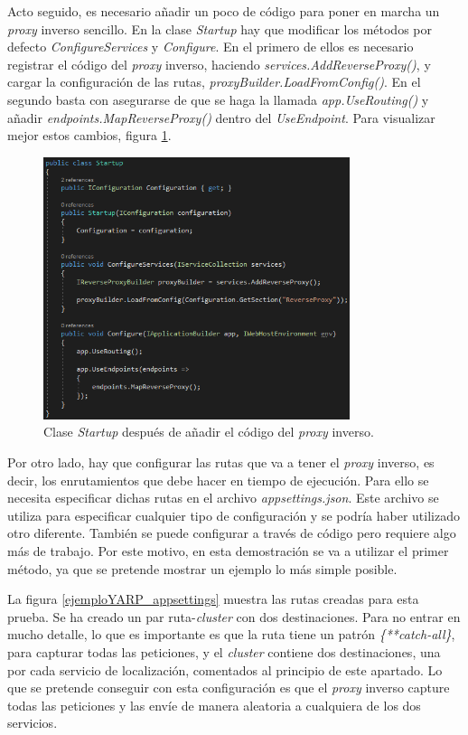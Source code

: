 \documentclass[11pt,spanish,listoffigures]{tfgetsinf}
\begin{document}
Acto seguido, es necesario añadir un poco de código para poner en marcha un \emph{proxy} inverso sencillo. En la clase \emph{Startup} hay que modificar los métodos por defecto \emph{ConfigureServices} y \emph{Configure}. En el primero de ellos es necesario registrar el código del \emph{proxy} inverso, haciendo \emph{services.AddReverseProxy()}, y cargar la configuración de las rutas, \emph{proxyBuilder.LoadFromConfig()}. En el segundo basta con asegurarse de que se haga la llamada \emph{app.UseRouting()} y añadir  \emph{endpoints.MapReverseProxy()} dentro del \emph{UseEndpoint}. Para visualizar mejor estos cambios, figura \ref{ejemploYARP_startup}.

\begin{figure}[ht]
\centering
\includegraphics[width=0.8\textwidth]{imagenes/ejemploYARP/startup}
\caption{Clase \emph{Startup} después de añadir el código del \emph{proxy} inverso.}
	\label{ejemploYARP_startup}
\end{figure}

Por otro lado, hay que configurar las rutas que va a tener el \emph{proxy} inverso, es decir, los enrutamientos que debe hacer en tiempo de ejecución. Para ello se necesita especificar dichas rutas en el archivo \emph{appsettings.json}. Este archivo se utiliza para especificar cualquier tipo de configuración y se podría haber utilizado otro diferente. También se puede configurar a través de código pero requiere algo más de trabajo. Por este motivo, en esta demostración se va a utilizar el primer método, ya que se pretende mostrar un ejemplo lo más simple posible.

La figura \ref{ejemploYARP_appsettings} muestra las rutas creadas para esta prueba. Se ha creado un par ruta-\emph{cluster} con dos destinaciones. Para no entrar en mucho detalle, lo que es importante es que la ruta tiene un patrón \emph{\{**catch-all\}}, para capturar todas las peticiones, y el \emph{cluster} contiene dos destinaciones, una por cada servicio de localización, comentados al principio de este apartado. Lo que se pretende conseguir con esta configuración es que el \emph{proxy} inverso capture todas las peticiones y las envíe de manera aleatoria a cualquiera de los dos servicios.
\end{document}

